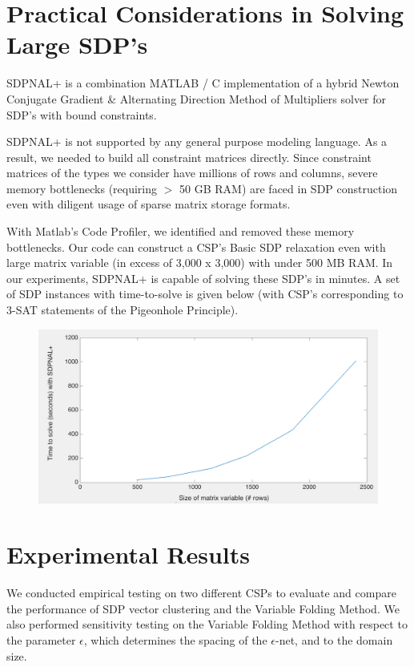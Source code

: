 \documentclass[12pt]{article} %
\begin{document}
\section{Practical Considerations in Solving Large SDP's}

SDPNAL+ \cite{yang2015sdpnal+, zhao2010newton} is a combination MATLAB / C implementation of a hybrid Newton Conjugate Gradient \& Alternating Direction Method of Multipliers solver for SDP's with bound constraints.

SDPNAL+ is not supported by any general purpose modeling language. As a result, we needed to build all constraint matrices directly. Since constraint matrices of the types we consider have millions of rows and columns, severe memory bottlenecks (requiring $>$ 50 GB RAM) are faced in SDP construction even with diligent usage of sparse matrix storage formats.

With Matlab's Code Profiler, we identified and removed these memory bottlenecks. Our code can construct a CSP's Basic SDP relaxation even with large matrix variable (in excess of 3,000 x 3,000) with under 500 MB RAM. In our experiments, SDPNAL+ is capable of solving these SDP's in minutes. A set of SDP instances with time-to-solve is given below (with CSP's corresponding to 3-SAT statements of the Pigeonhole Principle).

\begin{figure}
\includegraphics[width=\textwidth]{images/runtime}
\end{figure}

\section{Experimental Results}

We conducted empirical testing on two different CSPs to evaluate and compare the performance of SDP vector clustering and the Variable Folding Method. We also performed sensitivity testing on the Variable Folding Method with respect to the parameter $\epsilon$, which determines the spacing of the $\epsilon$-net, and to the domain size.
\end{document}

